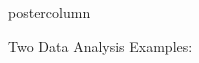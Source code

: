 \documentclass[final]{beamer}
\def\defgraphUnit#1#2#3#4{%
\setbox\csname dhgraph#1\endcsname{\vbox to #2{\hsize=#3\vss\hbox to #3{\hss#4\hss}\vss}}
}
\begin{document}
\begin{frame}
\begin{columns}
\begin{column}{.32\textwidth}
\begin{beamercolorbox}[center,wd=\textwidth]{postercolumn}
\begin{minipage}[T]{.95\textwidth}
{\begin{block}{Two Data Analysis Examples: }
\begin{table}
\begin{tabular}{c c c}






\end{tabular}
\end{table}
\end{block}}
\end{minipage}
\end{beamercolorbox}
\end{column}
\end{columns}
\end{frame}
\end{document}
